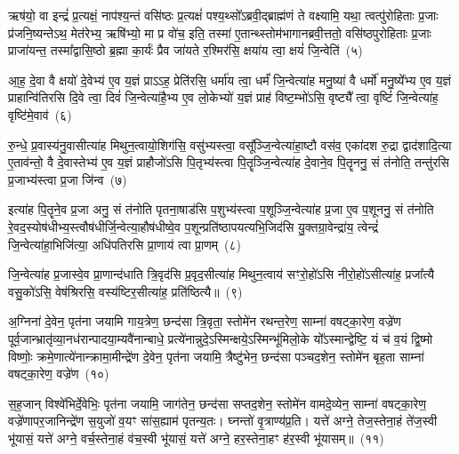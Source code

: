 {}%

ऋष॑यो॒ वा इन्द्रं॑ प्र॒त्यक्षं॒ नाप॑श्य॒न्तं वसि॑ष्ठः प्र॒त्यक्षं॑ पश्य॒थ्सो᳚\-ऽब्रवी॒द्ब्राह्म॑णं ते वक्ष्यामि॒ यथा॒ त्वत्पु॑रोहिताः प्र॒जाः प्र॑जनि॒ष्यन्ते\-ऽथ॒ मेत॑रेभ्य॒ ऋषि॑भ्यो॒ मा प्र वो॑च॒ इति॒ तस्मा॑ ए॒तान्थ्स्तोम॑भागानब्रवी॒त्ततो॒ वसि॑ष्ठपुरोहिताः प्र॒जाः प्राजा॑यन्त॒ तस्मा᳚द्वासि॒ष्ठो ब्र॒ह्मा का॒र्यः॑ प्रैव जा॑यते र॒श्मिर॑सि॒ क्षया॑य त्वा॒ क्षयं॑ जि॒न्वेति॑~(५)

आ॒ह॒ दे॒वा वै क्षयो॑ दे॒वेभ्य॑ ए॒व य॒ज्ञं प्राऽऽह॒ प्रेति॑रसि॒ धर्मा॑य त्वा॒ धर्मं॑ जि॒न्वेत्या॑ह मनु॒ष्या॑ वै धर्मो॑ मनु॒ष्ये᳚भ्य ए॒व य॒ज्ञं प्राहान्वि॑तिरसि दि॒वे त्वा॒ दिवं॑ जि॒न्वेत्या॑है॒भ्य ए॒व लो॒केभ्यो॑ य॒ज्ञं प्राह॑ विष्ट॒म्भो॑\-ऽसि॒ वृष्ट्यै᳚ त्वा॒ वृष्टिं॑ जि॒न्वेत्या॑ह॒ वृष्टि॑मे॒वाव॑~(६)

रु॒न्धे॒ प्र॒वास्य॑नु॒वासीत्या॑ह मिथुन॒त्वायो॒शिग॑सि॒ वसु॑भ्यस्त्वा॒ वसू᳚ञ्जि॒न्वेत्या॑हा॒ष्टौ वस॑व॒ एका॑\-दश रु॒द्रा द्वाद॑शादि॒त्या ए॒ताव॑न्तो॒ वै दे॒वास्तेभ्य॑ ए॒व य॒ज्ञं प्राहौजो॑\-ऽसि पि॒तृभ्य॑स्त्वा पि॒तॄञ्जि॒न्वेत्या॑ह दे॒वाने॒व पि॒तॄननु॒ सं त॑नोति॒ तन्तु॑रसि प्र॒जाभ्य॑स्त्वा प्र॒जा जि॑न्व~(७)

इत्या॑ह पि॒तॄने॒व प्र॒जा अनु॒ सं त॑नोति पृतना॒षाड॑सि प॒शुभ्य॑स्त्वा प॒शूञ्जि॒न्वेत्या॑ह प्र॒जा ए॒व प॒शूननु॒ सं त॑नोति रे॒वद॒स्योष॑धीभ्य॒स्त्वौष॑धीर्जि॒न्वेत्या॒हौष॑धीष्वे॒व प॒शून्प्रति॑\-ष्ठापयत्यभि॒जिद॑सि यु॒क्तग्रा॒वेन्द्रा॑य॒ त्वेन्द्रं॑ जि॒न्वेत्या॑हा॒भिजि॑त्या॒ अधि॑पतिरसि प्रा॒णाय॑ त्वा प्रा॒णम्~(८)

जि॒न्वेत्या॑ह प्र॒जास्वे॒व प्रा॒णान्द॑धाति त्रि॒वृद॑सि प्र॒वृद॒सीत्या॑ह मिथुन॒त्वाय॑ सꣳरो॒हो॑\-ऽसि नीरो॒हो॑\-ऽसीत्या॑ह॒ प्रजा᳚त्यै वसु॒को॑\-ऽसि॒ वेष॑श्रिरसि॒ वस्य॑ष्टिर॒सीत्या॑ह॒ प्रति॑ष्ठित्यै॥~(९)

{\anuvakamend[{जि॒न्वेत्यव॑ प्र॒जा जि॑न्व प्रा॒णन्त्रि॒ꣳ॒शच्च॑}]}%

अ॒ग्निना॑ दे॒वेन॒ पृत॑ना जयामि गाय॒त्रेण॒ छन्द॑सा त्रि॒वृता॒ स्तोमे॑न रथन्त॒रेण॒ साम्ना॑ वषट्का॒रेण॒ वज्रे॑ण पूर्व॒जान्भ्रातृ॑व्या॒नध॑रान्पादया॒म्यवै॑नान्बाधे॒ प्रत्ये॑नान्नुदे॒\-ऽस्मिन्क्षये॒\-ऽस्मिन्भू॑मिलो॒के यो᳚\-ऽस्मान्द्वेष्टि॒ यं च॑ व॒यं द्वि॒ष्मो विष्णोः॒ क्रमे॒णात्ये॑नान्क्रामा॒मीन्द्रे॑ण दे॒वेन॒ पृत॑ना जयामि॒ त्रैष्टु॑भेन॒ छन्द॑सा पञ्चद॒शेन॒ स्तोमे॑न बृह॒ता साम्ना॑ वषट्का॒रेण॒ वज्रे॑ण~(१०)

स॒ह॒जान् विश्वे॑भिर्दे॒वेभिः॒ पृत॑ना जयामि॒ जाग॑तेन॒ छन्द॑सा सप्तद॒शेन॒ स्तोमे॑न वामदे॒व्येन॒ साम्ना॑ वषट्का॒रेण॒ वज्रे॑णापर॒जानिन्द्रे॑ण स॒युजो॑ व॒यꣳ सा॑स॒ह्याम॑ पृतन्य॒तः। घ्नन्तो॑ वृ॒त्राण्य॑प्र॒ति। यत्ते॑ अग्ने॒ तेज॒स्तेना॒हं ते॑ज॒स्वी भू॑यासं॒ यत्ते॑ अग्ने॒ वर्च॒स्तेना॒हं व॑च॒स्वी भू॑यासं॒ यत्ते॑ अग्ने॒ हर॒स्तेना॒हꣳ ह॑र॒स्वी भू॑यासम्॥~(११)

